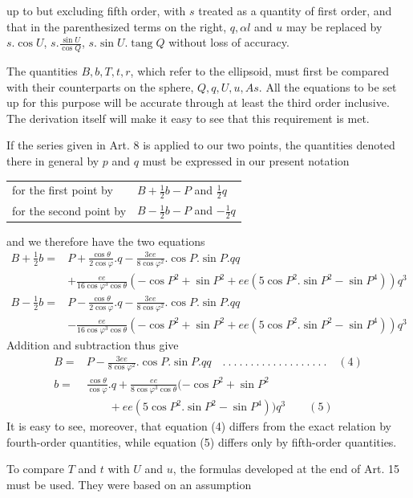 %
up to but excluding fifth order, with \(s\) treated as a quantity of first order, and that in the parenthesized terms on the right, \(q,\alpha l\) and \(u\) may be replaced by \(s\mathord{.}\cos U\), \(s\mathord{.}\frac{\sin U}{\cos Q}\), \(s\mathord{.}\sin U\mathord{.}\operatorname{tang}Q\) without loss of accuracy.

The quantities \(B,b,T,t,r\), which refer to the ellipsoid, must first be compared with their counterparts on the sphere, \(Q,q,U,u,As\). All the equations to be set up for this purpose will be accurate through at least the third order inclusive. The derivation itself will make it easy to see that this requirement is met.

If the series given in Art. 8 is applied to our two points, the quantities denoted there in general by \(p\) and \(q\) must be expressed in our present notation
\begin{center}
\begin{tabular}{ll}
for the first point by & \(B+\frac12b-P\) and \(\frac12q\)\\
for the second point by & \(B-\frac12b-P\) and \(-\frac12q\)
\end{tabular}
\end{center}
and we therefore have the two equations
\begingroup\fontsize{10}{12}\selectfont
\[
\begin{aligned}
B+\tfrac12b={}&P+\frac{\cos\theta}{2\cos\varphi}\mathord{.}q-\frac{3ee}{8\cos\varphi^2}\mathord{.}\cos P\mathord{.}\sin P\mathord{.}qq\\
&+\frac{ee}{16\cos\varphi^3\cos\theta}(-\cos P^2+\sin P^2+ee(5\cos P^2\mathord{.}\sin P^2-\sin P^4))q^3\\
B-\tfrac12b={}&P-\frac{\cos\theta}{2\cos\varphi}\mathord{.}q-\frac{3ee}{8\cos\varphi^2}\mathord{.}\cos P\mathord{.}\sin P\mathord{.}qq\\
&-\frac{ee}{16\cos\varphi^3\cos\theta}(-\cos P^2+\sin P^2+ee(5\cos P^2\mathord{.}\sin P^2-\sin P^4))q^3
\end{aligned}
\]
\endgroup
Addition and subtraction thus give
\[
\begin{aligned}
B={}&P-\frac{3ee}{8\cos\varphi^2}\mathord{.}\cos P\mathord{.}\sin P\mathord{.}qq\quad .\ .\ .\ .\ .\ .\ .\ .\ .\ .\ .\ .\ .\ .\ .\ .\ .\ .\ .\quad(4)\\
b={}&\frac{\cos\theta}{\cos\varphi}\mathord{.}q+\frac{ee}{8\cos\varphi^3\cos\theta}(-\cos P^2+\sin P^2\\
&\qquad+ee(5\cos P^2\mathord{.}\sin P^2-\sin P^4))q^3\qquad(5)
\end{aligned}
\]
It is easy to see, moreover, that equation (4) differs from the exact relation by fourth-order quantities, while equation (5) differs only by fifth-order quantities.

To compare \(T\) and \(t\) with \(U\) and \(u\), the formulas developed at the end of Art. 15 must be used. They were based on an assumption
